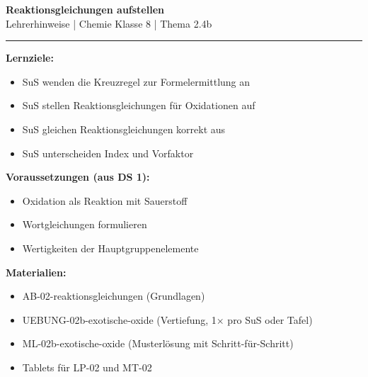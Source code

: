 \documentclass[11pt, a4paper]{article}
\newcommand{\abschnitt}[1]{%
    \vspace{10pt}%
    \noindent{\large\bfseries\textcolor{fachfarbe}{#1}}%
    \vspace{6pt}%
    \nopagebreak[4]%
}
\begin{document}

\begin{center}
    {\Large\bfseries\textcolor{fachfarbe}{Reaktionsgleichungen aufstellen}}\\[0.3em]
    {\normalsize Lehrerhinweise | Chemie Klasse 8 | Thema 2.4b}
\end{center}
\vspace{-0.3em}
\hrule
\vspace{0.8em}


\abschnitt{Überblick}

\begin{infobox}
\textbf{Lernziele:}
\begin{itemize}[leftmargin=1.5em, itemsep=0pt]
    \item SuS wenden die Kreuzregel zur Formelermittlung an
    \item SuS stellen Reaktionsgleichungen für Oxidationen auf
    \item SuS gleichen Reaktionsgleichungen korrekt aus
    \item SuS unterscheiden Index und Vorfaktor
\end{itemize}
\end{infobox}

\textbf{Voraussetzungen (aus DS 1):}
\begin{itemize}[leftmargin=1.5em, itemsep=0pt]
    \item Oxidation als Reaktion mit Sauerstoff
    \item Wortgleichungen formulieren
    \item Wertigkeiten der Hauptgruppenelemente
\end{itemize}

\textbf{Materialien:}
\begin{itemize}[leftmargin=1.5em, itemsep=0pt]
    \item AB-02-reaktionsgleichungen (Grundlagen)
    \item UEBUNG-02b-exotische-oxide (Vertiefung, 1× pro SuS oder Tafel)
    \item ML-02b-exotische-oxide (Musterlösung mit Schritt-für-Schritt)
    \item Tablets für LP-02 und MT-02
\end{itemize}
\end{document}
